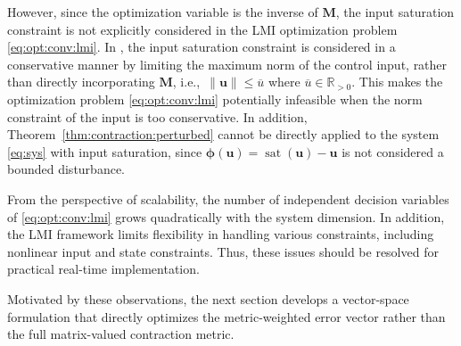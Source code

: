 \documentclass{ifacconf}
\newcommand\ie{\textrm{i.e.,\ }}
\newcommand{\ctxt}[2]{{\color{#1}{#2}\color{black}}}
\newcommand{\cred}[1]{{\ctxt{awesome}{#1}}}
\newcommand\R{\mathbb{R}}
\newcommand*{\mv}[1]{\boldsymbol{#1}} %
\newcommand*{\mm}[1]{\boldsymbol{#1}} %
\newcommand*{\norm}[1]{\left\lVert #1 \right\rVert} %
\DeclareMathOperator{\mysat}{{sat}}       %
\newcommand\der{\mathrm d}
\newcommand*{\ddtt}{
   \tfrac{\der}{\der t}
}
\begin{document}
However, since the optimization variable is the inverse of $\mm{M}$, the input saturation constraint is not explicitly considered in the LMI optimization problem \eqref{eq:opt:conv:lmi}.
In \cite{Tsukamoto:2019aa}, the input saturation constraint is considered in a conservative manner by limiting the maximum norm of the control input, rather than directly incorporating $\mm{M}$, \ie $\norm{\mv{u}}\leq \overline{u}$ where $\overline{u}\in\R_{>0}$.
This makes the optimization problem \eqref{eq:opt:conv:lmi} potentially infeasible when the norm constraint of the input is too conservative.
In addition, Theorem~\ref{thm:contraction:perturbed} cannot be directly applied to the system \eqref{eq:sys} with input saturation, since $\mv{\phi}(\mv{u})=\mysat(\mv{u})-\mv{u}$ is not considered a bounded disturbance.

From the perspective of scalability, the number of independent decision variables of \eqref{eq:opt:conv:lmi} grows quadratically with the system dimension.
In addition, the LMI framework limits flexibility in handling various constraints, including nonlinear input and state constraints.
Thus, these issues should be resolved for practical real-time implementation.

Motivated by these observations, the next section develops a vector-space formulation that directly optimizes the metric-weighted error vector rather than the full matrix-valued contraction metric.


\end{document}
